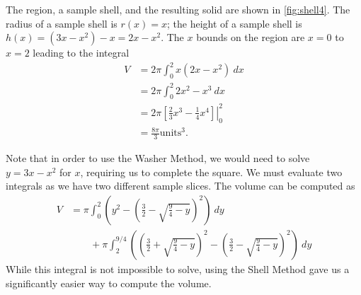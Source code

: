 {The region, a sample shell, and the resulting solid are shown in \autoref{fig:shell4}. The radius of a sample shell is $r(x)=x$; the height of a sample shell is $h(x)=(3x-x^2)-x=2x-x^2$. The $x$ bounds on the region are $x=0$ to $x=2$ leading to the integral
\begin{align*}
V&=2\pi \int_0^2 x(2x-x^2) \ dx\\
&=2\pi \int_0^2 2x^2-x^3 \ dx\\
&=2\pi \left.\left[ \frac23 x^3-\frac14 x^4 \right] \right|_0^2\\
&=\frac{8\pi}{3} \text{units}^3.
\end{align*}

Note that in order to use the Washer Method, we would need to solve $y=3x-x^2$ for $x$, requiring us to complete the square. We must evaluate two integrals as we have two different sample slices. The volume can be computed as 
\begin{align*}
V&=\pi\int_0^2\left(y^2-\left(\frac32-\sqrt{\frac94 -y}\right)^2\right)\ dy \\
&\qquad+\pi\int_2^{9/4}\left(\left(\frac32+\sqrt{\frac94 -y}\right)^2
-\left(\frac32-\sqrt{\frac94 -y}\right)^2\right)\ dy
\end{align*}
While this integral is not impossible to solve, using the Shell Method gave us a significantly easier way to compute the volume.}

%

